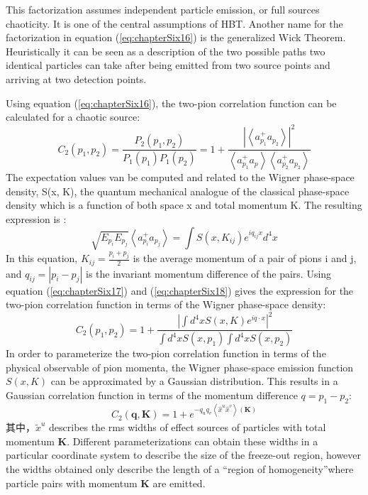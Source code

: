 This factorization assumes independent particle emission, or full sources chaoticity. %
It is one of the central assumptions of HBT.%
Another name for the factorization in equation (\ref{eq:chapterSix16}) is the generalized Wick Theorem.%
Heuristically it can be seen as a description of the two possible paths two identical particles can take after
being emitted from two source points and arriving at two detection points.%
\par
Using equation (\ref{eq:chapterSix16}), the two-pion correlation function can be calculated for a chaotic source:
\begin{equation}
  \label{eq:chapterSix17}
  C_{2}(p_{1}, p_{2}) = \frac{P_{2}(p_{1}, p_{2})}{P_{1}(p_{1})P_{1}(p_{2})} = 1 + \frac{|\left<a_{p_{1}}^{+}a_{p_{2}}\right>|^{2}}{\left<a_{p_{1}}^{+}a_{p_{}}\right>\left<a_{p_{2}}^{+}a_{p_{2}}\right>}
\end{equation}
The expectation values van be computed and related to the Wigner phase-space density,%
S(x, K),%
the quantum mechanical analogue of the classical phase-space density which is a function of both space x and total momentum K.%
The resulting expression is :
\begin{equation}
  \label{eq:chapterSix18}
  \sqrt{E_{p_{i}}E_{p_{j}}}\left<a_{p_{i}}^{+}a_{p_{j}}\right> = \int{S(x, K_{ij})e^{iq_{ij}x}d^{4}x}
\end{equation}
In this equation, $K_{ij} = \frac{p_{i}+p_{j}}{2}$ is the average momentum of a pair of pions i and j,%
and $q_{ij} = |p_{i} - p_{j}|$ is the invariant momentum difference of the pairs.%
Using equation (\ref{eq:chapterSix17}) and (\ref{eq:chapterSix18}) gives the expression for the two-pion correlation function in terms of the Wigner phase-space density:
\begin{equation}
  \label{eq:chapterSix19}
  C_{2}(p_{1}, p_{2}) = 1 + \frac{|\int{d^{4}xS(x,K)e^{iq\cdot{x}}}|^{2}}{\int{d^{4}xS(x, p_{1})}\int{d^{4}xS(x,p_{2})}}
\end{equation}
In order to parameterize the two-pion correlation function in terms of the physical observable of pion momenta,%
the Wigner phase-space emission function $S(x,K)$ can be approximated by a Gaussian distribution.%
This results in a Gaussian correlation function in terms of the momentum difference $q = p_{1} - p_{2}$:
\begin{equation}
  \label{eq:chapterSix20}
  C_{2}(\textbf{q}, \textbf{K}) = 1 + e^{-q_{u}q_{v}\left<\widehat{x}^{u}\widehat{x}^{v}\right>(\textbf{K})}
\end{equation}
其中，$\widetilde{x}^{u}$ describes the rms widths of effect sources of particles with total momentum \textbf{K}. Different parameterizations can obtain these widths in a particular coordinate system to describe the size of the freeze-out region,%
however the widths obtained only describe the length of a \textquotedblleft{region of homogeneity}\textquotedblright where particle pairs with momentum \textbf{K} are emitted.%

